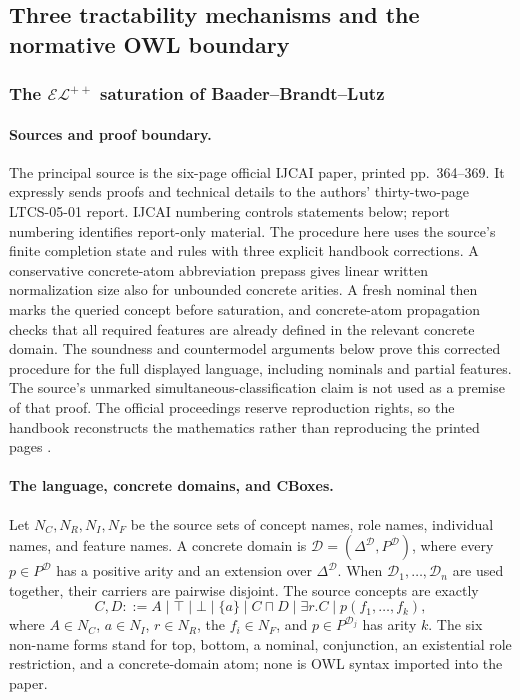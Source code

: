 
\subsection{Three tractability mechanisms and the normative OWL boundary}
\label{sec:p09-presentation-n-c-010}

\subsubsection{The \(\mathcal{EL}^{++}\) saturation of Baader--Brandt--Lutz}

\paragraph{Sources and proof boundary.}
The principal source is the six-page official IJCAI paper, printed
pp.~364--369.  It expressly sends proofs and technical details to the authors'
thirty-two-page LTCS-05-01 report.
IJCAI numbering controls statements below; report numbering identifies
report-only material.  The procedure here uses the source's finite completion
state and rules with three explicit handbook corrections.  A conservative
concrete-atom abbreviation prepass gives linear written normalization size
also for unbounded concrete arities.  A fresh nominal then marks the queried
concept before saturation, and concrete-atom propagation checks that all
required features are already defined in the relevant concrete domain.
The soundness and countermodel arguments below prove this corrected
procedure for the full displayed language, including nominals and partial
features.  The source's unmarked simultaneous-classification claim is not used
as a premise of that proof.  The official proceedings reserve reproduction
rights, so the handbook reconstructs the mathematics rather than reproducing
the printed pages
\cite{BaaderBrandtLutz2005,BaaderBrandtLutz2005TR}.

\paragraph{The language, concrete domains, and CBoxes.}
Let \(N_C,N_R,N_I,N_F\) be the source sets of concept names, role names,
individual names, and feature names.  A concrete domain is
\(\mathcal D=(\Delta^{\mathcal D},P^{\mathcal D})\), where every
\(p\in P^{\mathcal D}\) has a positive arity and an extension over
\(\Delta^{\mathcal D}\).  When
\(\mathcal D_1,\ldots,\mathcal D_n\) are used together, their carriers are
pairwise disjoint.  The source concepts are exactly
\[
 C,D::=A\mid\top\mid\bot\mid\{a\}\mid C\sqcap D
       \mid\exists r.C\mid p(f_1,\ldots,f_k),
\]
where \(A\in N_C\), \(a\in N_I\), \(r\in N_R\), the \(f_i\in N_F\), and
\(p\in P^{\mathcal D_j}\) has arity \(k\).  The six non-name forms stand for
top, bottom, a nominal, conjunction, an existential role restriction, and a
concrete-domain atom; none is OWL syntax imported into the paper.

